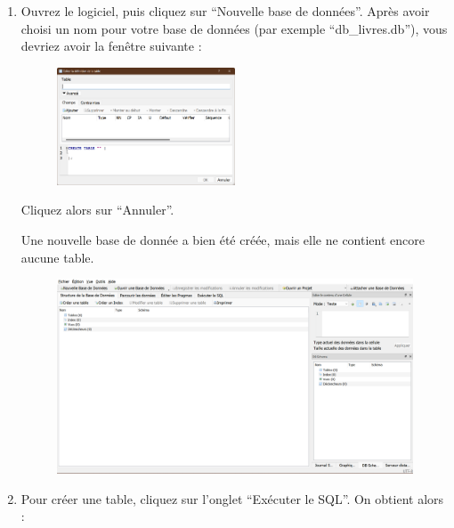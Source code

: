 \documentclass[
  letterpaper,
  DIV=11,
  numbers=noendperiod]{scrartcl}
\begin{document}
\begin{enumerate}
\def\labelenumi{\arabic{enumi}.}
\item
  Ouvrez le logiciel, puis cliquez sur ``Nouvelle base de données''.
  Après avoir choisi un nom pour votre base de données (par exemple
  ``db\_livres.db''), vous devriez avoir la fenêtre suivante :

  \begin{figure}

  {\centering \includegraphics[width=0.5\textwidth,height=\textheight]{TP1_1.png}

  }

  \end{figure}

  Cliquez alors sur ``Annuler''.

  Une nouvelle base de donnée a bien été créée, mais elle ne contient
  encore aucune table.

  \begin{figure}

  {\centering \includegraphics{TP1_2.png}

  }

  \end{figure}
\item
  Pour créer une table, cliquez sur l'onglet ``Exécuter le SQL''. On
  obtient alors :

  \begin{figure}


\end{figure}
\end{enumerate}
\end{document}
